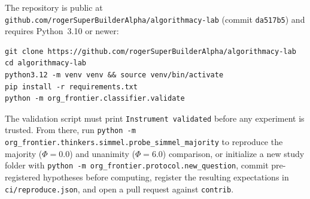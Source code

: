 \documentclass[11pt,a4paper]{article}
\begin{document}
The repository is public at \texttt{github.com/rogerSuperBuilderAlpha/algorithmacy-lab} (commit \texttt{da517b5}) and requires Python~3.10 or newer:
\begin{verbatim}
git clone https://github.com/rogerSuperBuilderAlpha/algorithmacy-lab
cd algorithmacy-lab
python3.12 -m venv venv && source venv/bin/activate
pip install -r requirements.txt
python -m org_frontier.classifier.validate
\end{verbatim}
The validation script must print \texttt{Instrument validated} before any experiment is trusted. From there, run \texttt{python -m org\_frontier.thinkers.simmel.probe\_simmel\_majority} to reproduce the majority ($\Phi = 0.0$) and unanimity ($\Phi = 6.0$) comparison, or initialize a new study folder with \texttt{python -m org\_frontier.protocol.new\_question}, commit pre-registered hypotheses before computing, register the resulting expectations in \texttt{ci/reproduce.json}, and open a pull request against \texttt{contrib}.
\end{document}
